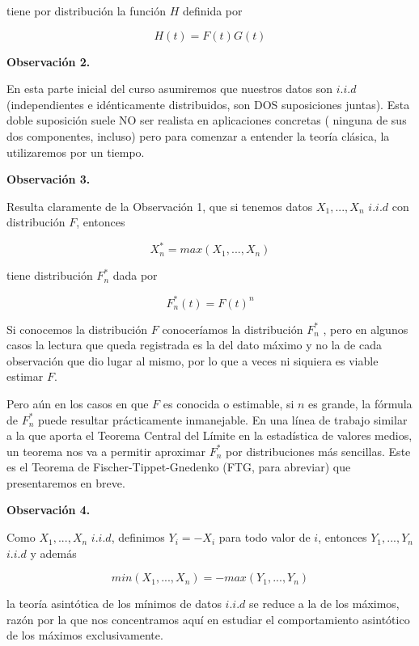 \documentclass[
  oneside]{article}
\begin{document}
tiene por distribución la función \(H\) definida por

\begin{equation}
H(t)= F(t) G(t)
\end{equation}

\textbf{Observación 2.}

En esta parte inicial del curso asumiremos que nuestros datos son
\(i.i.d\) (independientes e idénticamente distribuidos, son DOS
suposiciones juntas). Esta doble suposición suele NO ser realista en
aplicaciones concretas ( ninguna de sus dos componentes, incluso) pero
para comenzar a entender la teoría clásica, la utilizaremos por un
tiempo.

\textbf{Observación 3.}

Resulta claramente de la Observación 1, que si tenemos datos
\(X_1,...,X_n\) \(i.i.d\) con distribución \(F\), entonces

\begin{equation}
X_n^* = max (X_1,...,X_n)
\end{equation}

tiene distribución \(F_n^*\) dada por

\begin{equation}
F_n^* (t)= F(t)^n
\end{equation}

Si conocemos la distribución \(F\) conoceríamos la distribución
\(F_n^*\) , pero en algunos casos la lectura que queda registrada es la
del dato máximo y no la de cada observación que dio lugar al mismo, por
lo que a veces ni siquiera es viable estimar \(F\).

Pero aún en los casos en que \(F\) es conocida o estimable, si \(n\) es
grande, la fórmula de \(F_n^*\) puede resultar prácticamente
inmanejable. En una línea de trabajo similar a la que aporta el Teorema
Central del Límite en la estadística de valores medios, un teorema nos
va a permitir aproximar \(F_n^{*}\) por distribuciones más sencillas.
Este es el Teorema de Fischer-Tippet-Gnedenko (FTG, para abreviar) que
presentaremos en breve.

\textbf{Observación 4.}

Como \(X_1,...,X_n\) \(i.i.d\), definimos \(Y_i = -X_i\) para todo valor
de \(i\), entonces \(Y_1,...,Y_n\) \(i.i.d\) y además

\begin{equation}
min(X_1,...,X_n) = - max(Y_1,...,Y_n)
\end{equation}

la teoría asintótica de los mínimos de datos \(i.i.d\) se reduce a la de
los máximos, razón por la que nos concentramos aquí en estudiar el
comportamiento asintótico de los máximos exclusivamente.
\end{document}
